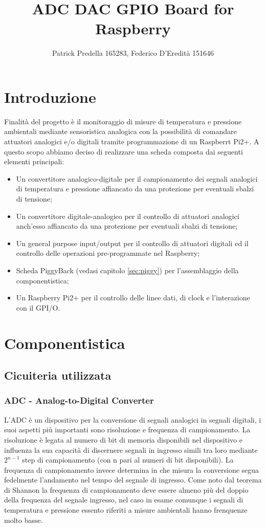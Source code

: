 \documentclass[10pt]{article}
\title{ADC DAC GPIO Board for Raspberry}
\author{Patrick Predella 165283, Federico D'Eredità 151646 }
\date{}
\begin{document}
\maketitle
\tableofcontents

\section{Introduzione}
Finalità del progetto è il monitoraggio di misure di temperatura e pressione ambientali mediante sensoristica analogica con la possibilità di comandare attuatori analogici e/o digitali tramite programmazione di un Raspberrt Pi2+.
A questo scopo abbiamo deciso di realizzare una scheda composta dai seguenti elementi principali:
\begin{itemize}
\item Un convertitore analogico-digitale per il campionamento dei segnali analogici di temperatura e pressione affiancato da una protezione per eventuali sbalzi di tensione;
\item Un convertitore digitale-analogico per il controllo di attuatori analogici anch'esso affiancato da una protezione per eventuali sbalzi di tensione;
\item Un general purpose input/output per il controllo di attuatori digitali ed il controllo delle operazioni pre-programmate nel Raspberry;
\item Scheda PiggyBack (vedasi capitolo \ref{sec:piggy}) per l'assemblaggio della componentistica;
\item Un Raspberry Pi2+ per il controllo delle linee dati, di clock e l'interazione con il GPI/O.
\end{itemize}


\section{Componentistica}
	\subsection{Cicuiteria utilizzata}

		\subsubsection{ADC - Analog-to-Digital Converter}\label{sec:adc}
		L'ADC è un dispositivo per la conversione di segnali analogici in segnali digitali, i suoi aspetti più importanti sono risoluzione e frequenza di campionamento.
		La risoluzione è legata al numero di bit di memoria disponibili nel dispositivo e influenza la sua capacità di discernere segnali in ingresso simili tra loro mediante $2^{n-1}$ step di campionamento (con n pari al numeri di bit disponibili). La frequenza di campionamento invece determina in che misura la conversione segua fedelmente l'andamento nel tempo del segnale di ingresso. Come noto dal teorema di Shannon la frequenza di campionamento deve essere almeno più del doppio della frequenza del segnale ingresso, nel caso in esame comunque i segnali di temperatura e pressione essento riferiti a misure ambientali hanno frenquenze molto basse.
\end{document}
